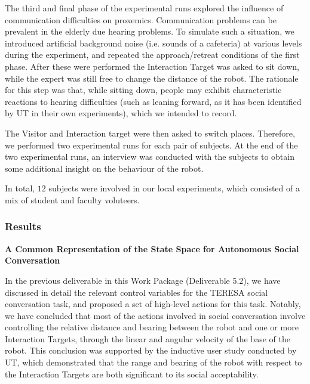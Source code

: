 \documentclass[a4paper,11pt]{report}
\begin{document}
The third and final phase of the experimental runs explored the influence of communication difficulties on proxemics. Communication problems can be prevalent in the elderly due hearing problems. To simulate such a situation, we introduced artificial background noise (i.e. sounds of a cafeteria) at various levels during the experiment, and repeated the approach/retreat conditions of the first phase. After these were performed the Interaction Target was asked to sit down, while the expert was still free to change the distance of the robot. The rationale for this step was that, while sitting down, people may exhibit characteristic reactions to hearing difficulties (such as leaning forward, as it has been identified by UT in their own experiments), which we intended to record.

The Visitor and Interaction target were then asked to switch places. Therefore, we performed two experimental runs for each pair of subjects. At the end of the two experimental runs, an interview was conducted with the subjects to obtain some additional insight on the behaviour of the robot.

In total, $12$  subjects were involved in our local experiments, which consisted of a mix of student and faculty voluteers.

\subsubsection{Results}
\label{sec:social_results}

{\bf A Common Representation of the State Space for Autonomous Social Conversation}
\label{sec:defining_the_state-space}

In the previous deliverable in this Work Package (Deliverable 5.2), we have discussed in detail the relevant control variables for the TERESA social conversation task, and proposed a set of high-level actions for this task. Notably, we have concluded that most of the actions involved in social conversation involve controlling the relative distance and bearing between the robot and one or more Interaction Targets, through the linear and angular velocity of the base of the robot. This conclusion was supported by the inductive user study conducted by UT, which demonstrated that the range and bearing of the robot with respect to the Interaction Targets are both significant to its social acceptability. 
\end{document}
